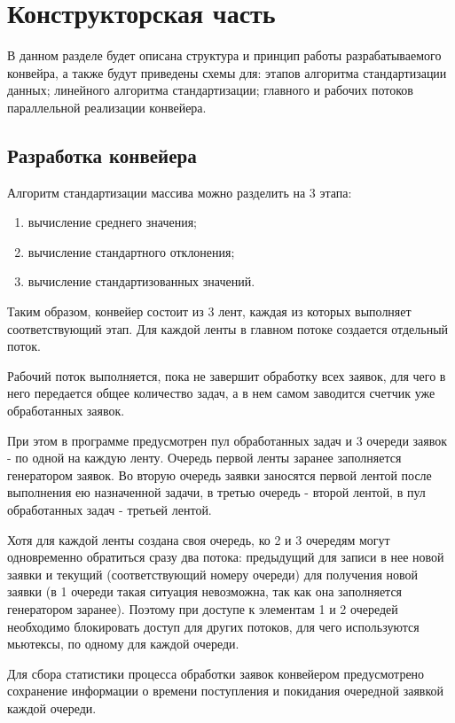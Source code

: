 \chapter{Конструкторская часть}

В данном разделе будет описана структура и принцип работы разрабатываемого конвейра, а также будут приведены схемы для: этапов алгоритма стандартизации данных; линейного алгоритма стандартизации; главного и рабочих потоков параллельной реализации конвейера.

\section{Разработка конвейера}

Алгоритм стандартизации массива можно разделить на 3 этапа:
\begin{enumerate}[label={\arabic*)}]
	\item вычисление среднего значения;
	\item вычисление стандартного отклонения;
	\item вычисление стандартизованных значений.
\end{enumerate}

Таким образом, конвейер состоит из 3 лент, каждая из которых выполняет соответствующий этап. Для каждой ленты в главном потоке создается отдельный поток. 

Рабочий поток выполняется, пока не завершит обработку всех заявок, для чего в него передается общее количество задач, а в нем самом заводится счетчик уже обработанных заявок. 


При этом в программе предусмотрен пул обработанных задач и 3 очереди заявок - по одной на каждую ленту. Очередь первой ленты заранее заполняется генератором заявок. Во вторую очередь заявки заносятся первой лентой после выполнения ею назначенной задачи, в третью очередь - второй лентой, в пул обработанных задач  - третьей лентой.

Хотя для каждой ленты создана своя очередь, ко 2 и 3 очередям могут одновременно обратиться сразу два потока: предыдущий для записи в нее новой заявки и текущий (соответствующий номеру очереди) для получения новой заявки (в 1 очереди такая ситуация невозможна, так как она заполняется генератором заранее). Поэтому при доступе к элементам 1 и 2 очередей необходимо блокировать доступ для других потоков, для чего используются мьютексы, по одному для каждой очереди.
  
Для сбора статистики процесса обработки заявок конвейером предусмотрено сохранение информации о времени поступления и покидания очередной заявкой каждой очереди.

